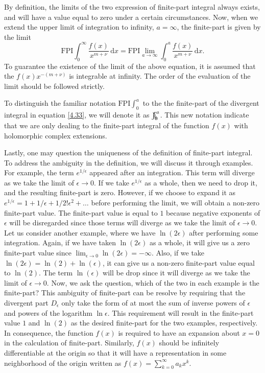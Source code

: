 By definition, the limits of the two expression of finite-part integral always exists, and will have a value equal to zero under a certain circumstances. Now, when we extend the upper limit of integration to infinity, $a=\infty$, the finite-part is given by the limit
\begin{equation}
    \mathrm{FPI}  \int_{0}^{\infty} \frac{f(x)}{x^{m+\nu}} \, \mathrm{d}x = \mathrm{FPI} \lim_{a \to \infty} \int_{0}^{a} \frac{f(x)}{x^{m+\nu}} \, \mathrm{d}x.
\end{equation}
To guarantee the existence of the limit of the above equation, it is assumed that the $f(x)x^{-(m+\nu)}$ is integrable at infinity. The order of the evaluation of the limit should be followed strictly. 

To distinguish the familiar notation $\mathrm{FPI} \int_0^{a}$ to the the finite-part of the divergent integral in equation \eqref{4.33}, we will denote it as $\bbint{0}{a}$. This new notation indicate that  we are only dealing to the finite-part integral of the function $f(x)$ with holomorphic complex extensions.

Lastly, one may question the uniqueness of the definition of finite-part integral. To address the ambiguity in the definition, we will discuss it through examples. For example, the term $e^{1/\epsilon}$ appeared after an integration. This term will diverge as we take the limit of $\epsilon \to 0$. If we take $e^{1/\epsilon}$ as a whole, then we need to drop it, and the resulting finite-part is zero. However, if we choose to expand it as  $e^{1/\epsilon} = 1 + 1/\epsilon + 1/2! \epsilon^2 + \ldots$ before performing the limit, we will obtain a non-zero finite-part value. The finite-part value is equal to $1$ because negative exponents of $\epsilon$ will be disregarded since those terms will diverge as we take the limit of $\epsilon \to 0$. Let us consider another example, where we have $\ln (2 \epsilon)$ after performing some integration. Again, if we have taken $\ln (2 \epsilon)$  as a whole, it will give us a zero finite-part value since $\lim_{\epsilon \to 0} \ln(2 \epsilon) = -\infty$. Also, if we take $\ln (2\epsilon) = \ln(2) + \ln(\epsilon)$, it can give us a non-zero finite-part value equal to $\ln(2)$. The term $\ln(\epsilon)$ will be drop since it will diverge as we take the limit of $\epsilon \to 0$. Now, we ask the question, which of the two in each example is the finite-part? This ambiguity of finite-part can be resolve by requiring that the divergent part $D_{\epsilon}$ only take the form of at most the sum of inverse powers of $\epsilon$ and powers of the logarithm $\ln{\epsilon}$. This requirement will result in the finite-part value $1$ and $\ln (2)$ as the desired finite-part for the two examples, respectively. In consequence, the function $f(x)$ is required to have an expansion about $x=0$ in the calculation of finite-part. Similarly, $f(x)$ should be infinitely differentiable at the origin so that it will have a representation in some neighborhood of the origin written as $f(x) = \sum_{k=0}^{\infty} a_k x^{k}$.


